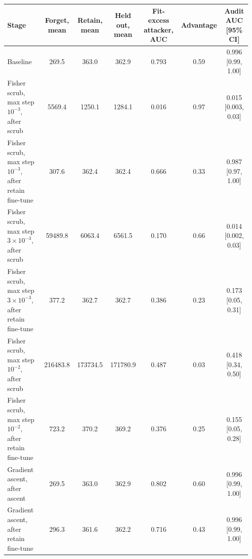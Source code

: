 \begin{tabular}{lcccccc}
\toprule
Stage & Forget, mean & Retain, mean & Held out, mean & Fit-excess attacker, AUC & Advantage & Audit AUC [95\% CI] \\
\midrule
Baseline & 269.5 & 363.0 & 362.9 & 0.793 & 0.59 & 0.996 [0.99, 1.00] \\
Fisher scrub, max step $10^{-3}$, after scrub & 5569.4 & 1250.1 & 1284.1 & 0.016 & 0.97 & 0.015 [0.003, 0.03] \\
Fisher scrub, max step $10^{-3}$, after retain fine-tune & 307.6 & 362.4 & 362.4 & 0.666 & 0.33 & 0.987 [0.97, 1.00] \\
Fisher scrub, max step $3\times 10^{-3}$, after scrub & 59489.8 & 6063.4 & 6561.5 & 0.170 & 0.66 & 0.014 [0.002, 0.03] \\
Fisher scrub, max step $3\times 10^{-3}$, after retain fine-tune & 377.2 & 362.7 & 362.7 & 0.386 & 0.23 & 0.173 [0.05, 0.31] \\
Fisher scrub, max step $10^{-2}$, after scrub & 216483.8 & 173734.5 & 171780.9 & 0.487 & 0.03 & 0.418 [0.34, 0.50] \\
Fisher scrub, max step $10^{-2}$, after retain fine-tune & 723.2 & 370.2 & 369.2 & 0.376 & 0.25 & 0.155 [0.05, 0.28] \\
Gradient ascent, after ascent & 269.5 & 363.0 & 362.9 & 0.802 & 0.60 & 0.996 [0.99, 1.00] \\
Gradient ascent, after retain fine-tune & 296.3 & 361.6 & 362.2 & 0.716 & 0.43 & 0.996 [0.99, 1.00] \\
\bottomrule
\end{tabular}
